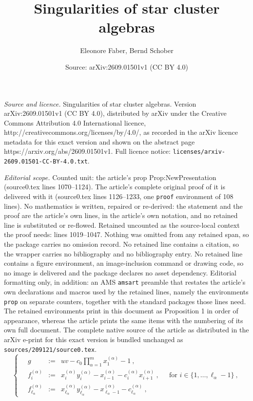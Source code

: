 \documentclass[10pt,a4paper]{amsart}
\title{Singularities of star cluster algebras}
\author{Eleonore Faber, Bernd Schober}
\date{Source: arXiv:2609.01501v1 (CC BY 4.0)}
\newcommand{\len}{\ell}
\begin{document}
\maketitle

\noindent\emph{Source and licence.} Singularities of star cluster algebras. Version arXiv:2609.01501v1 (CC BY 4.0), distributed by arXiv under the Creative Commons Attribution 4.0 International licence, http://creativecommons.org/licenses/by/4.0/, as recorded in the arXiv licence metadata for this exact version and shown on the abstract page https://arxiv.org/abs/2609.01501v1. Full licence notice: \texttt{licenses/arxiv-2609.01501-CC-BY-4.0.txt}.\par\smallskip

\noindent\textit{Editorial scope.} Counted unit: the article's prop Prop:NewPresentation (source0.tex lines 1070--1124). The article's complete original proof of it is delivered with it (source0.tex lines 1126--1233, one \texttt{proof} environment of 108 lines). No mathematics is written, repaired or re-derived: the statement and the proof are the article's own lines, in the article's own notation, and no retained line is substituted or re-flowed.  Retained uncounted as the source-local context the proof needs: lines 1019--1047.  Nothing was omitted from any retained span, so the package carries no omission record.  No retained line contains a citation, so the wrapper carries no bibliography and no bibliography entry.  No retained line contains a figure environment, an image-inclusion command or drawing code, so no image is delivered and the package declares no asset dependency.  Editorial formatting only, in addition: an AMS \texttt{amsart} preamble that restates the article's own declarations and macros used by the retained lines, namely the environments \texttt{prop} on separate counters, together with the standard packages those lines need.  The retained environments print in this document as Proposition 1 in order of appearance, whereas the article prints the same items with the numbering of its own full document.  The complete native source of the article as distributed in the arXiv e-print for this exact version is bundled unchanged as \texttt{sources/209121/source0.tex}.
\begin{equation}
	\label{eq:gen-original}
	\left\{ \quad
	\begin{array}{rcll}
		g 
		& := &	
		\displaystyle 
		u v  - c_0 \prod_{\alpha=1}^m x_1^{(\alpha)} - 1 \ ,
		\\[15pt]
		f_{i}^{(\alpha)} 
		& := &
		x_i^{(\alpha)} y_i^{(\alpha)} - x_{i-1}^{(\alpha)} - c_i^{(\alpha)} x_{i+1}^{(\alpha)}  \ ,
		&
		\ \ \ 
		\mbox{for } i \in \{ 1, \ldots, \len_\alpha - 1 \} \ ,
		\\[10pt]
		f_{\len_\alpha}^{(\alpha)} 
		& := &
		x_{\len_\alpha}^{(\alpha)} y_{\len_\alpha}^{(\alpha)} - x_{\len_\alpha-1}^{(\alpha)} - c_{\len_\alpha}^{(\alpha)}   \ , 
	\end{array}
	\right.
\end{equation}
\end{document}

